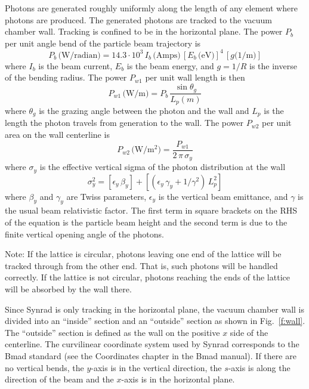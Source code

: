 \documentclass[11pt]{article}
\begin{document}
Photons are generated roughly uniformly along the length of any
element where photons are produced. The generated photons are tracked
to the vacuum chamber wall. Tracking is confined to be in the
horizontal plane.  The power $P_b$ per unit angle bend of the particle
beam trajectory is\cite{b:sands}
\begin{equation}
  P_b \, \mbox{(W/radian)} = 14.3 \cdot 10^3  \, I_b \, \mbox{(Amps)} \, 
  [E_b \, \mbox{(eV)}]^4 \, [g \mbox{(1/m)}] 
\end{equation}
where $I_b$ is the beam current, $E_b$ is the beam energy, and $g =
1/R$ is the inverse of the bending radius. The power $P_{w1}$ per unit
wall length is then
\begin{equation}
  P_{w1} \, \mbox{(W/m)} = P_b \, \frac{\sin\theta_g}{L_p (m)}
\end{equation}
where $\theta_g$ is the grazing angle between the photon and the wall
and $L_p$ is the length the photon travels from generation to the wall.
The power $P_{w2}$ per unit area on the wall centerline is
\begin{equation}
  P_{w2} \, \mbox{(W/m$^2$)} = \frac{P_{w1}}{2 \, \pi \, \sigma_y}
\end{equation}
where $\sigma_y$ is the effective vertical sigma of the photon distribution at the wall 
\begin{equation}
  \sigma_y^2 = [\epsilon_y \, \beta_y] + [(\epsilon_y \, \gamma_y + 1 / \gamma^2) \, L_p^2]
\end{equation}
where $\beta_y$ and $\gamma_y$ are Twiss parameters, $\epsilon_y$ is
the vertical beam emittance, and $\gamma$ is the usual beam
relativistic factor. The first term in square brackets on the RHS of
the equation is the particle beam height and the second term is due to
the finite vertical opening angle of the photons.

Note: If the lattice is circular, photons leaving one end of the
lattice will be tracked through from the other end. That is, such
photons will be handled correctly. If the lattice is not circular,
photons reaching the ends of the lattice will be absorbed by the wall
there.

Since Synrad is only tracking in the horizontal plane, the vacuum
chamber wall is divided into an ``inside'' section and an ``outside''
section as shown in Fig.~\ref{f:wall}. The ``outside'' section is
defined as the wall on the positive $x$ side of the centerline. The
curvilinear coordinate system used by Synrad corresponds to the Bmad
standard (see the Coordinates chapter in the Bmad
manual\cite{b:bmad}). If there are no vertical bends, the $y$-axis is
in the vertical direction, the $s$-axis is along the direction of the
beam and the $x$-axis is in the horizontal plane.
\end{document}
